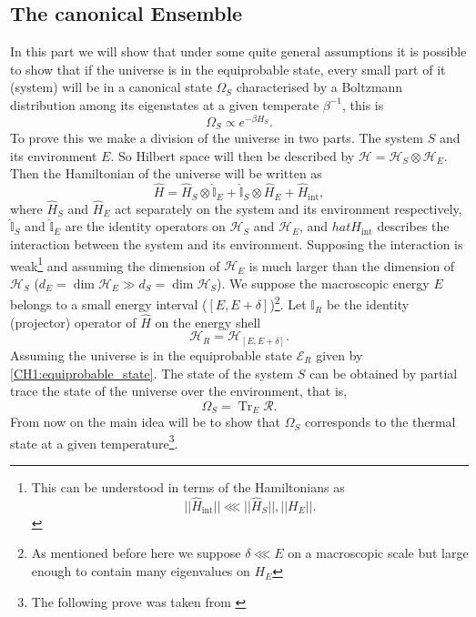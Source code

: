 \subsection{The canonical Ensemble}
In this part we will show that under some quite general assumptions it is possible to show that if the universe is in the equiprobable state, every small part of it (system) will be in a canonical state $\Omega_{S}$ characterised by a Boltzmann distribution among its eigenstates at a given temperate $\beta^{-1}$, this is
\begin{equation}
\Omega_S \propto e^{-\beta H_{S}}.
\label{CH1:Canonical_form}
\end{equation}
\indent To prove this we make a division of the universe in two parts. The system $S$ and its environment $E$. So Hilbert space will then be described by $\mathcal{H}=\mathcal{H}_{S}\otimes\mathcal{H}_E$. Then the Hamiltonian of the universe will be written as
\begin{equation}
\hat{H}=\hat{H}_{S} \otimes \hat{\mathbb{I}}_{E}+\hat{\mathbb{I}}_{S} \otimes \hat{H}_{E}+\hat{H}_{\mathrm{int}},
\label{CH1:Hamiltonian_split_env_system}
\end{equation}
where $\hat{H}_S$ and $\hat{H}_E$ act separately on the system and its environment respectively, $\hat{\mathbb{I}}_{S}$ and $\hat{\mathbb{I}}_{E}$ are the identity operators on $\mathcal{H}_S$ and $\mathcal{H}_E$, and $hat{H}_{\mathrm{int}}$ describes the interaction between the system and its environment. Supposing the interaction is weak\footnote{This can be understood in terms of the Hamiltonians as
\[||\hat{H}_{\mathrm{int}}||\lll ||\hat{H}_{S}||, ||H_{E}||.\]} and assuming the dimension of $\mathcal{H}_E$ is much larger than the dimension of $\mathcal{H}_S$ ($d_{E}=\operatorname{dim} \mathcal{H}_{E} \gg d_{S}=\operatorname{dim} \mathcal{H}_{S}$). We suppose the macroscopic energy $E$ belongs to a small energy interval ($[E,E+\delta]$)\footnote{As mentioned before here we suppose $\delta\lll E$ on a macroscopic scale but large enough to contain many eigenvalues on $H_E$}. Let $\mathbb{I}_{R}$ be the identity (projector) operator of $\hat{H}$ on the energy shell 
\begin{equation}
\mathcal{H}_{R}=\mathcal{H}_{[E, E+\delta]}.
\end{equation}
\indent Assuming the universe is in the equiprobable state $\mathcal{E}_R$ given by \eqref{CH1:equiprobable_state}.  The state of the system $S$ can be obtained by partial trace the state of the universe over the environment, that is,
\begin{equation}
\Omega_S = \operatorname{Tr}_{E}\mathcal{R}.
\label{CH1:Canonical_state}
\end{equation}
\indent From now on the main idea will be to show that $\Omega_S$ corresponds to the  thermal state at a given temperature\footnote{The following prove was taken from \cite{huang_statistical_1987}}.\\

